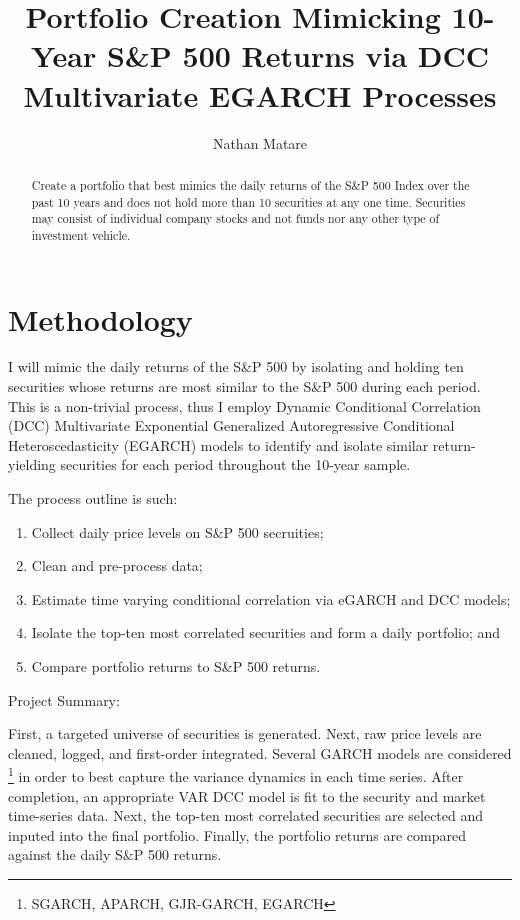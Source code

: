 \documentclass[]{elsarticle} %
\providecommand{\tightlist}{%
  \setlength{\itemsep}{0pt}\setlength{\parskip}{0pt}}
\begin{document}
\begin{frontmatter}

  \title{Portfolio Creation \textbar{} Mimicking 10-Year S\&P 500 Returns via DCC
Multivariate EGARCH Processes}
    \author[]{Nathan Matare}
  
  
      \address[]{The University of Chicago Booth School of Business}
    \address[Another University]{nmatare@chicagobooth.edu}
  
  \begin{abstract}
  Create a portfolio that best mimics the daily returns of the S\&P 500
  Index over the past 10 years and does not hold more than 10 securities
  at any one time. Securities may consist of individual company stocks and
  not funds nor any other type of investment vehicle.
  \end{abstract}
  
 \end{frontmatter}

\section{Methodology}\label{methodology}

I will mimic the daily returns of the S\&P 500 by isolating and holding
ten securities whose returns are most similar to the S\&P 500 during
each period. This is a non-trivial process, thus I employ Dynamic
Conditional Correlation (DCC) Multivariate Exponential Generalized
Autoregressive Conditional Heteroscedasticity (EGARCH) models to
identify and isolate similar return-yielding securities for each period
throughout the 10-year sample.

The process outline is such:

\begin{enumerate}
\def\labelenumi{\arabic{enumi}.}
\tightlist
\item
  Collect daily price levels on S\&P 500 secruities;
\item
  Clean and pre-process data;
\item
  Estimate time varying conditional correlation via eGARCH and DCC
  models;
\item
  Isolate the top-ten most correlated securities and form a daily
  portfolio; and
\item
  Compare portfolio returns to S\&P 500 returns.
\end{enumerate}

Project Summary:

First, a targeted universe of securities is generated. Next, raw price
levels are cleaned, logged, and first-order integrated. Several GARCH
models are considered \footnote{SGARCH, APARCH, GJR-GARCH, EGARCH} in
order to best capture the variance dynamics in each time series. After
completion, an appropriate VAR DCC model is fit to the security and
market time-series data. Next, the top-ten most correlated securities
are selected and inputed into the final portfolio. Finally, the
portfolio returns are compared against the daily S\&P 500 returns.
\end{document}
